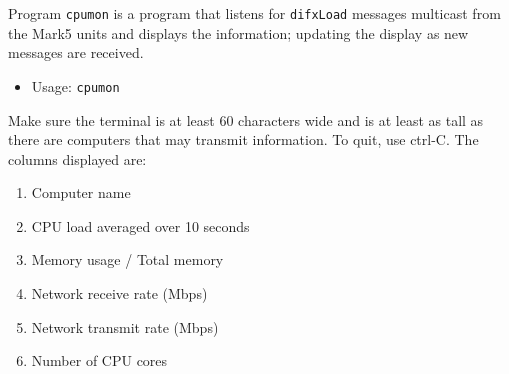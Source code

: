Program {\tt cpumon} is a program that listens for {\tt difxLoad} messages multicast from the Mark5 units and displays the information; updating the display as new messages are received.

\begin{itemize}
\item[] Usage: {\tt cpumon}
\end{itemize}

\noindent
Make sure the terminal is at least 60 characters wide and is at least as tall as there are computers that may transmit information.
To quit, use ctrl-C.
The columns displayed are:
\begin{enumerate}
\item Computer name
\item CPU load averaged over 10 seconds
\item Memory usage / Total memory
\item Network receive rate (Mbps)
\item Network transmit rate (Mbps)
\item Number of CPU cores
\end{enumerate}










